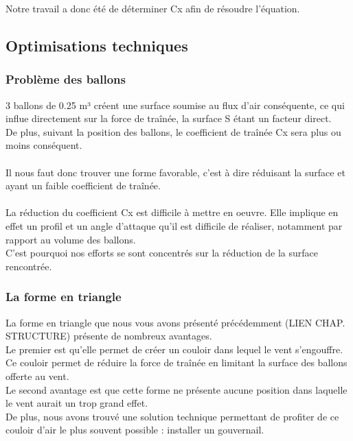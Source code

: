 \documentclass[a4paper,11pt]{article}
\begin{document}
		Notre travail a donc été de déterminer Cx afin de résoudre l'équation.
\subsection{Optimisations techniques}
\subsubsection{Problème des ballons}
	3 ballons de 0.25 m³ créent une surface soumise au flux d'air conséquente, ce qui influe directement sur la force de traînée, la surface S étant un facteur direct.\\
	De plus, suivant la position des ballons, le coefficient de traînée Cx sera plus ou moins conséquent.\\
	\\
	Il nous faut donc trouver une forme favorable, c'est à dire réduisant la surface et ayant un faible coefficient de traînée.\\
	\\
	La réduction du coefficient Cx est difficile à mettre en oeuvre. Elle implique en effet un profil et un angle d'attaque qu'il est difficile de réaliser, notamment par rapport au volume des ballons.\\
	C'est pourquoi nos efforts se sont concentrés sur la réduction de la surface rencontrée.

\subsubsection{La forme en triangle}
	La forme en triangle que nous vous avons présenté précédemment (LIEN CHAP. STRUCTURE) présente de nombreux avantages.
	\\
	Le premier est qu'elle permet de créer un couloir dans lequel le vent s'engouffre. Ce couloir permet de réduire la force de traînée en limitant la surface des ballons offerte au vent. \\
	Le second avantage est que cette forme ne présente aucune position dans laquelle le vent aurait un trop grand effet.\\
	De plus, nous avons trouvé une solution technique permettant de profiter de ce couloir d'air le plus souvent possible : installer un gouvernail.
\end{document}
